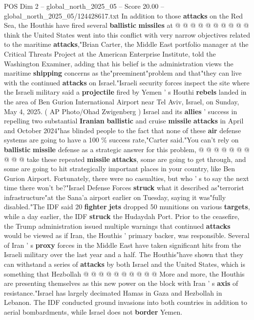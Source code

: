 \begin{textsample}{POS Dim 2 – global\_north\_2025\_05 – Score 20.00 – global\_north\_2025\_05/124428617.txt}
In addition to those \textbf{attacks} on the Red Sea, the Houthis have fired several \textbf{ballistic} \textbf{missiles} at @ @ @ @ @ @ @ @ @ @ think the United States went into this conflict with very narrow objectives related to the maritime \textbf{attacks},"Brian Carter, the Middle East portfolio manager at the Critical Threats Project at the American Enterprise Institute, told the Washington Examiner, adding that his belief is the administration views the maritime \textbf{shipping} concerns as the"preeminent"problem and that"they can live with the continued \textbf{attacks} on Israel."Israeli security forces inspect the site where the Israeli military said a \textbf{projectile} fired by Yemen ' s Houthi \textbf{rebels} landed in the area of Ben Gurion International Airport near Tel Aviv, Israel, on Sunday, May 4, 2025. ( AP Photo/Ohad Zwigenberg ) Israel and its \textbf{allies} ' success in repelling two substantial \textbf{Iranian} \textbf{ballistic} and cruise \textbf{missile} \textbf{attacks} in April and October 2024"has blinded people to the fact that none of these \textbf{air} defense systems are going to have a 100 \% success rate,"Carter said."You can't rely on \textbf{ballistic} \textbf{missile} defense as a strategic answer for this problem, @ @ @ @ @ @ @ @ @ @ take these repeated \textbf{missile} \textbf{attacks}, some are going to get through, and some are going to hit strategically important places in your country, like Ben Gurion Airport.
Fortunately, there were no casualties, but who ' s to say the next time there won't be?"Israel Defense Forces \textbf{struck} what it described as"terrorist infrastructure"at the Sana'a airport earlier on Tuesday, saying it was"fully disabled."The IDF said 20 \textbf{fighter} \textbf{jets} dropped 50 munitions on various \textbf{targets}, while a day earlier, the IDF \textbf{struck} the Hudaydah Port.
Prior to the ceasefire, the Trump administration issued multiple warnings that continued \textbf{attacks} would be viewed as if Iran, the Houthis ' primary backer, was responsible.
Several of Iran ' s \textbf{proxy} forces in the Middle East have taken significant hits from the Israeli military over the last year and a half.
The Houthis"have shown that they can withstand a series of \textbf{attacks} by both Israel and the United States, which is something that Hezbollah @ @ @ @ @ @ @ @ @ @ More and more, the Houthis are presenting themselves as this new power on the block with Iran ' s \textbf{axis} of resistance."Israel has largely decimated Hamas in Gaza and Hezbollah in Lebanon.
The IDF conducted ground invasions into both countries in addition to aerial bombardments, while Israel does not \textbf{border} Yemen.

\end{textsample}

